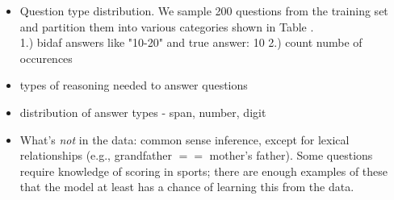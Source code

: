 \begin{itemize}
    \item Question type distribution. 
    We sample 200 questions from the training set and partition them into various categories shown in Table .\\
    1.) bidaf answers like "10-20" and true answer: 10
    2.) count numbe of occurences 
    \item types of reasoning needed to answer questions 
    \item distribution of answer types - span, number, digit
    \item What's \emph{not} in the data: common sense inference, except for lexical relationships (e.g., grandfather $==$ mother's father).  Some questions require knowledge of scoring in sports; there are enough examples of these that the model at least has a chance of learning this from the data.
\end{itemize}

